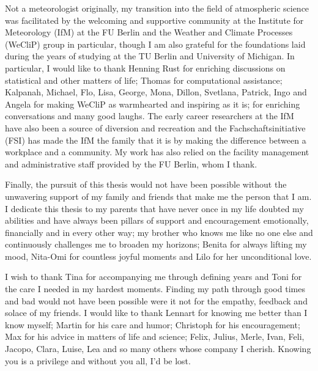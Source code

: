Not a meteorologist originally, my transition into the field of atmospheric
science was facilitated by the welcoming and supportive community at the
Institute for Meteorology (IfM) at the FU Berlin and the
Weather and Climate Processes (WeCliP) group in particular, though I am also
grateful for the foundations laid during the years of studying at
the TU Berlin and University of Michigan. In particular, I would like to
thank Henning Rust for enriching discussions on statistical and other
matters of life; Thomas for computational assistance; Kalpanah,
Michael, Flo, Lisa, George, Mona, Dillon, Svetlana, Patrick, Ingo and Angela
for making WeCliP as warmhearted and inspiring as it is; for enriching
conversations and many good laughs. The early career
researchers at the
IfM have also been a source of diversion and recreation and the
Fachschaftsinitiative (FSI) has made the IfM the family that it is by
making the difference between a workplace and a community. My work
has also relied on the
facility management and administrative staff provided by the FU Berlin,
whom I thank.

\bigskip

Finally, the pursuit of this thesis would not have been possible without the
unwavering support of my family and friends that make me the person that
I am. I dedicate this thesis to my parents that have never once in my life
doubted my abilities and have always been pillars of support and encouragement
emotionally, financially and in every other way; my brother who
knows me like no one else and continuously challenges me to broaden my horizons;
Benita for always lifting my mood, Nita-Omi for countless joyful moments
and Lilo for her unconditional love.

I wish to thank Tina for accompanying me through defining years and Toni for 
the care I needed in my hardest moments. Finding my path through good times
and bad would not have been possible were it not for the empathy, feedback
and solace of my friends. I would like to
thank Lennart for knowing me better than I know myself;
Martin for his care and humor; Christoph for his encouragement; Max for
his advice in matters of life and science; Felix, Julius, Merle, Ivan, Feli,
Jacopo, Clara, Luise, Lea and so many others whose company
I cherish. Knowing you is a privilege and without you all, I'd be lost.
\cleardoublepage

\listoffigures
\cleardoublepage

\listoftables
\cleardoublepage


\printglossary[type=\acronymtype,title=List of Acronyms,nonumberlist]

\cleardoublepage
